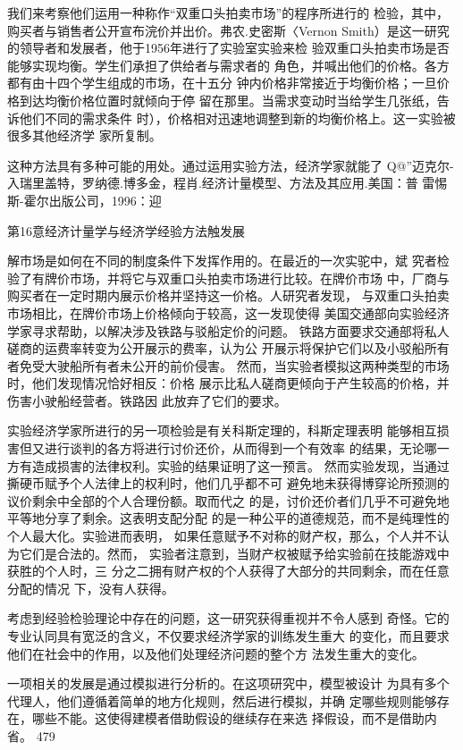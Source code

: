 我们来考察他们运用一种称作“双重口头拍卖市场”的程序所进行的
检验，其中，购买者与销售者公开宣布浣价并出价。弗农.史密斯〈Vernon
Smith）是这一研究的领导者和发展者，他于1956年进行了实验室实验来检
验双重口头拍卖市场是否能够实现均衡。学生们承担了供给者与需求者的
角色，并喊出他们的价格。各方都有由十四个学生组成的市场，在十五分
钟内价格非常接近于均衡价格；一旦价格到达均衡价格位置时就倾向于停
留在那里。当需求变动时当给学生几张纸，告诉他们不同的需求条件
时），价格相对迅速地调整到新的均衡价格上。这一实验被很多其他经济学
家所复制。

这种方法具有多种可能的用处。通过运用实验方法，经济学家就能了
Q@”迈克尔-入瑞里盖特，罗纳德.博多金，程肖.经济计量模型、方法及其应用.美国：普
雷惕斯-霍尔出版公司，1996：迎

第16意经济计量学与经济学经验方法触发展

解市场是如何在不同的制度条件下发挥作用的。在最近的一次实驼中，斌
究者检验了有牌价市场，并将它与双重口头拍卖市场进行比较。在牌价市场
中，厂商与购买者在一定时期内展示价格并坚持这一价格。人研究者发现，
与双重口头拍卖市场相比，在牌价市场上价格倾向于较高，这一发现使得
美国交通部向实验经济学家寻求帮助，以解决涉及铁路与驳船定价的问题。
铁路方面要求交通部将私人磋商的运费率转变为公开展示的费率，认为公
开展示将保护它们以及小驳船所有者免受大驶船所有者未公开的前价侵害。
然而，当实验者模拟这两种类型的市场时，他们发现情况恰好相反：价格
展示比私人磋商更倾向于产生较高的价格，并伤害小驶船经营者。铁路因
此放弃了它们的要求。

实验经济学家所进行的另一项检验是有关科斯定理的，科斯定理表明
能够相互损害但又进行谈判的各方将进行讨价还价，从而得到一个有效率
的结果，无论哪一方有造成损害的法律权利。实验的结果证明了这一预言。
然而实验发现，当通过撕硬币赋予个人法律上的权利时，他们几乎都不可
避免地未获得博穿论所预测的议价剩余中全部的个人合理份额。取而代之
的是，讨价还价者们几乎不可避免地平等地分享了剩余。这表明支配分配
的是一种公平的道德规范，而不是纯理性的个人最大化。实验进而表明，
如果任意赋予不对称的财产权，那么，个人并不认为它们是合法的。然而，
实验者注意到，当财产权被赋予给实验前在技能游戏中获胜的个人时，三
分之二拥有财产权的个人获得了大部分的共同剩余，而在任意分配的情况
下，没有人获得。

考虑到经验检验理论中存在的问题，这一研究获得重视并不令人感到
奇怪。它的专业认同具有宽泛的含义，不仅要求经济学家的训练发生重大
的变化，而且要求他们在社会中的作用，以及他们处理经济问题的整个方
法发生重大的变化。

一项相关的发展是通过模拟进行分析的。在这项研究中，模型被设计
为具有多个代理人，他们遵循着简单的地方化规则，然后进行模拟，并确
定哪些规则能够存在，哪些不能。这使得建模者借助假设的继续存在来选
择假设，而不是借助内省。
479



